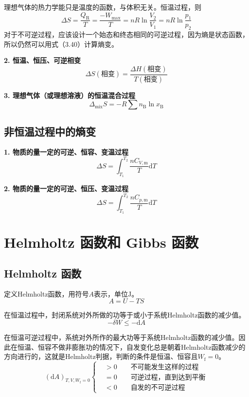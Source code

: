\documentclass[lang=cn,newtx,10pt,scheme=chinese]{elegantbook}
\begin{document}
理想气体的热力学能只是温度的函数，与体积无关。恒温过程，则
\begin{equation}
	\Delta S=\frac{Q_\mathrm{R} }{T}=\frac{-W_\mathrm{max} }{T} =nR\ln \frac{V_2}{V_1}  =nR\ln \frac{p_1}{p_2} 
\end{equation}
对于不可逆过程，应该设计一个始态和终态相同的可逆过程，因为熵是状态函数，所以仍然可以用式（3.40）计算熵变。

\textbf{2. 恒温、恒压、可逆相变}
\begin{equation}
	\Delta S(\text{相变}) = \frac{\Delta H(\text{相变})}{T(\text{相变})}	
\end{equation}

\textbf{3. 理想气体（或理想溶液）的恒温混合过程}
\begin{equation}
	\Delta _\mathrm{mix}S=-R\sum n_\mathrm{B}\ln x_\mathrm{B}   
\end{equation}

\subsection{非恒温过程中的熵变}
\textbf{1. 物质的量一定的可逆、恒容、变温过程}
\begin{equation}
	\Delta S=\int_{T_1}^{T_2}\frac{nC_{V,\mathrm{m} }}{T}\mathrm{d}T   
\end{equation}

\textbf{2. 物质的量一定的可逆、恒压、变温过程}
\begin{equation}
	\Delta S=\int_{T_1}^{T_2}\frac{nC_{p,\mathrm{m} }}{T}\mathrm{d}T   
\end{equation}

\section{Helmholtz 函数和 Gibbs 函数}
\subsection{Helmholtz 函数}
定义Helmholtz函数，用符号$A$表示，单位$\mathrm{J}$。
\begin{equation}
	A=U-TS
\end{equation}

在恒温过程中，封闭系统对外所做的功等于或小于系统Helmholtz函数的减少值。
\begin{equation}
	-\delta W \leqslant -\mathrm{d}A
\end{equation}

在恒温可逆过程中，系统对外所作的最大功等于系统Helmholtz函数的减少值。因此在恒温、恒容不做非膨胀功的情况下，自发变化总是朝着Helmholtz函数减少的方向进行的，这就是Helmholtz判据，判断的条件是恒温、恒容且$W_\mathrm{f}=0$。
\begin{equation}
	(\mathrm{d}A)_{T,V,W_\mathrm{f}=0} \left\{
	\begin{aligned}
		&> 0 \qquad \text{不可能发生这样的过程} \\
		&= 0 \qquad \text{可逆过程，直到达到平衡}\\
		&< 0 \qquad \text{自发的不可逆过程} 
	\end{aligned}
	\right.
\end{equation}
\end{document}
